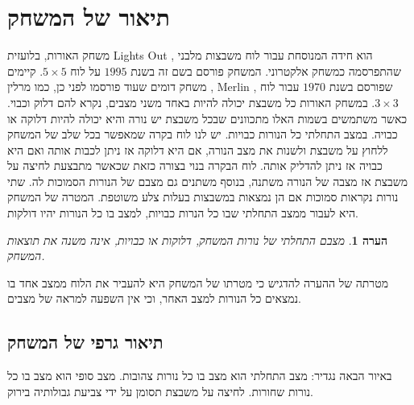 \documentclass[12pt,leqno]{article}
\theoremstyle{theoremdd}
\newtheorem{comm}{הערה}[section]
\begin{document}
\section{תיאור של המשחק}
משחק האורות,  בלועזית
\textenglish{Lights Out}
,
הוא
חידה המנוסחת עבור לוח משבצות מלבני
שהתפרסמה  כמשחק אלקטרוני.
המשחק פורסם בשם זה 
בשנת 
$1995$
על לוח 
$5 \times 5$.
קיימים 
משחק דומים שעוד פורסמו לפני
כן,
כמו מרלין
,
\textenglish{Merlin}
,
שפורסם בשנת 
$1970$
עבור לוח 
$3 \times 3$.
במשחק האורות
כל משבצת יכולה להיות באחד משני מצבים, נקרא להם דלוק וכבוי.
כאשר משתמשים בשמות האלו מתכוונים שבכל משבצת יש נורה והיא יכולה להיות דלוקה או כבויה. במצב התחלתי כל הנורות כבויות.
יש לנו לוח בקרה שמאפשר בכל שלב של המשחק ללחוץ על משבצת ולשנות את מצב הנורה, אם היא דלוקה אז ניתן לכבות אותה ואם היא כבויה אז ניתן להדליק אותה.
לוח הבקרה בנוי בצורה כזאת שכאשר מתבצעת לחיצה על משבצת אז מצבה של הנורה משתנה, בנוסף משתנים גם מצבם של הנורות הסמוכות לה.
שתי נורות נקראות סמוכות אם הן נמצאות במשבצות בעלות צלע משוטפת.
המטרה של המשחק היא לעבור ממצב התחלתי שבו כל הנרות כבויות, למצב בו כל הנורות יהיו דולקות. 
\begin{comm}
מצבם התחלתי של נורות המשחק, דלוקות או כבויות, אינה משנה את תוצאות המשחק.
\end{comm}
מטרתה של ההערה להדגיש כי
מטרתו של המשחק היא להעביר
 את הלוח ממצב אחד בו נמצאים כל הנורות למצב האחר,
 וכי אין השפעה למראה של מצבים.
 
\subsection{תיאור גרפי של המשחק}
באיור הבאה נגדיר:
מצב התחלתי הוא מצב בו כל נורות
צהובות.
מצב סופי הוא מצב בו כל נורות שחורות.
לחיצה על משבצת תסומן על ידי צביעת גבולותיה בירוק.
\end{document}
